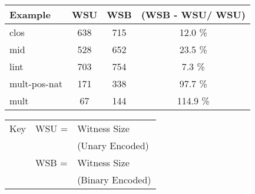 \documentclass{llncs}
\begin{document}
\begin{table*}[htbp]
\begin{small}
\begin{minipage}{3in}
\begin{tabular}{|l|c|c|c|}
\hline
Example & WSU & WSB & (WSB - WSU/ WSU) \\
\hline
clos & 638 & 715 & 12.0 \%\\
mid & 528 & 652 & 23.5 \%\\
lint & 703 & 754 & 7.3 \%\\
mult-pos-nat & 171 & 338 & 97.7 \%\\
mult & 67 & 144 & 114.9 \%\\
\hline
\end{tabular}
\end{minipage}
\begin{minipage}{1in}
\begin{tabular}{lll}
Key & WSU = & Witness Size \\ &&(Unary Encoded)\\
&WSB = & Witness Size \\&&(Binary Encoded)\\
\end{tabular} 
\end{minipage}
\end{small}
\caption{\label{tab:unarybinary}
Unary versus Binary Encodings: no Caching}
\end{table*}
\end{document}
